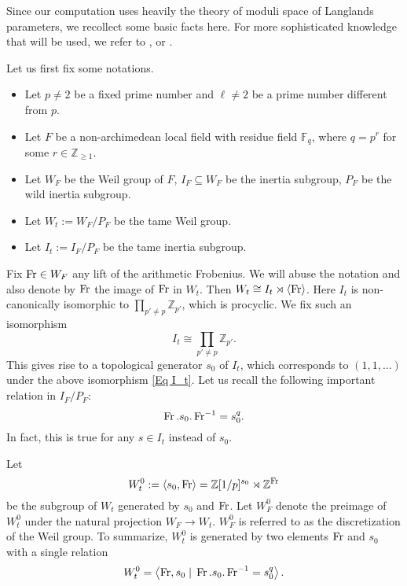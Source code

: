 	Since our computation uses heavily the theory of moduli space of Langlands parameters, we recollect some basic facts here. For more sophisticated knowledge that will be used, we refer to \cite[Section 3 and Section 4]{dat2022ihes}, or \cite[Section 2 and Section 4]{dhkm2020moduli}. 
	
	Let us first fix some notations.
	\begin{itemize}
		\item Let $p \neq 2$ be a fixed prime number and $\ell \neq 2$ be a prime number different from $p$. 
		\item Let $F$ be a non-archimedean local field with residue field $\mathbb{F}_q$, where $q=p^r$ for some $r \in \mathbb{Z}_{\geq 1}$.
		\item Let $W_F$ be the Weil group of $F$, $I_F \subseteq W_F$ be the inertia subgroup, $P_F$ be the wild inertia subgroup.
		\item Let $W_t:=W_F/P_F$ be the tame Weil group.
		\item Let $I_t:=I_F/P_F$ be the tame inertia subgroup.
	\end{itemize}
	     Fix $\operatorname{Fr} \in W_F$ any lift of the arithmetic Frobenius. We will abuse the notation and also denote by $\operatorname{Fr}$ the image of $\operatorname{Fr}$ in $W_t$. Then $W_t \cong I_t \rtimes \left<\operatorname{Fr}\right>$. Here $I_t$ is non-canonically isomorphic to $\prod_{p'\neq p}\mathbb{Z}_{p'}$, which is procyclic. We fix such an isomorphism
	     \begin{equation}\label{Eq I_t}
	     	I_t \cong \prod_{p'\neq p}\mathbb{Z}_{p'}.
	     \end{equation}
    This gives rise to a topological generator $s_0$ of $I_t$, which corresponds to $(1, 1, ...)$ under the above isomorphism \eqref{Eq I_t}. Let us recall the following important relation in $I_F/P_F$:
	\begin{equation}\label{Eq Fr s_0}
		\operatorname{Fr}.s_0.\operatorname{Fr}^{-1}=s_0^q.
	\end{equation}
	In fact, this is true for any $s \in I_t$ instead of $s_0$.
	
	Let 
	$$W_t^0:=\left<s_0, \operatorname{Fr}\right>=\mathbb{Z}[1/p]^{s_0} \rtimes \mathbb{Z}^{\operatorname{Fr}}$$ 
	be the subgroup of $W_t$ generated by $s_0$ and $\operatorname{Fr}$. Let $W_F^0$ denote the preimage of $W_t^0$ under the natural projection $W_F \to W_t$. $W_F^0$ is referred to as the discretization of the Weil group. To summarize, $W_t^0$ is generated by two elements $\operatorname{Fr}$ and $s_0$ with a single relation 
	\begin{equation}\label{Equation presentation of the tame Weil group}
		W_t^0=\left<\operatorname{Fr}, s_0\;|\;\operatorname{Fr}.s_0.\operatorname{Fr}^{-1}=s_0^q\right>.
	\end{equation} 
	
